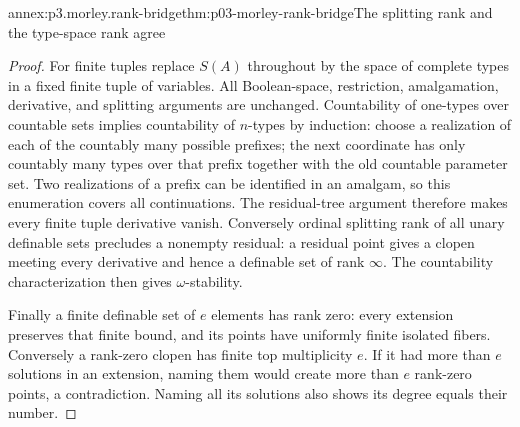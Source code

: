 \begin{annexitem}{annex:p3.morley.rank-bridge}{thm:p03-morley-rank-bridge}{The splitting rank and the type-space rank agree}
\begin{proof}
For finite tuples replace \(S(A)\) throughout by the
space of complete types in a fixed finite tuple of variables.
All Boolean-space, restriction, amalgamation, derivative,
and splitting arguments are unchanged. Countability of
one-types over countable sets implies countability of
\(n\)-types by induction: choose a realization of each
of the countably many possible prefixes; the next
coordinate has only countably many types over that
prefix together with the old countable parameter set.
Two realizations of a prefix can be identified in an
amalgam, so this enumeration covers all continuations.
The residual-tree argument therefore makes every finite
tuple derivative vanish. Conversely ordinal splitting
rank of all unary definable sets precludes a nonempty
residual: a residual point gives a clopen meeting every
derivative and hence a definable set of rank \(\infty\).
The countability characterization then gives
\(\omega\)-stability.

Finally a finite definable set of \(e\) elements has
rank zero: every extension preserves that finite bound,
and its points have uniformly finite isolated fibers.
Conversely a rank-zero clopen has finite top multiplicity
\(e\). If it had more than \(e\) solutions in an
extension, naming them would create more than \(e\)
rank-zero points, a contradiction. Naming all its
solutions also shows its degree equals their number.
\end{proof}
\end{annexitem}


